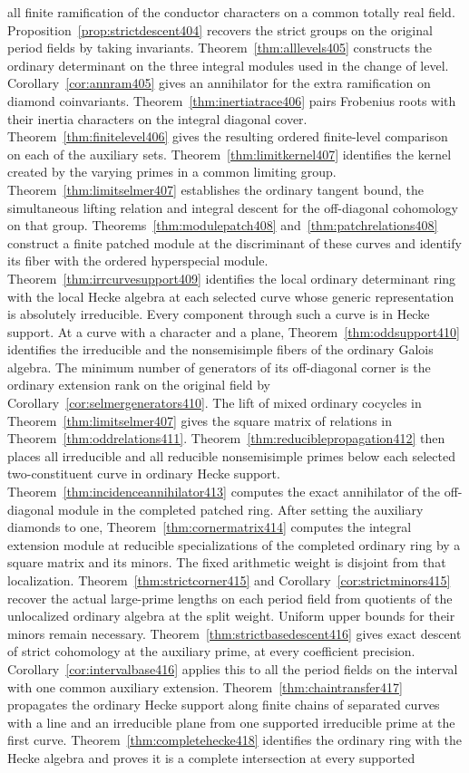 \documentclass[a4paper,11pt]{article}
\theoremstyle{definition}
\theoremstyle{remark}
\numberwithin{equation}{section}
\begin{document}
all finite ramification of the conductor characters on a common totally real field. Proposition~\ref{prop:strictdescent404} recovers the strict groups on the original period fields by taking invariants. Theorem~\ref{thm:alllevels405} constructs the ordinary determinant on the three integral modules used in the change of level. Corollary~\ref{cor:annram405} gives an annihilator for the extra ramification on diamond coinvariants. Theorem~\ref{thm:inertiatrace406} pairs Frobenius roots with their inertia characters on the integral diagonal cover. Theorem~\ref{thm:finitelevel406} gives the resulting ordered finite-level comparison on each of the auxiliary sets. Theorem~\ref{thm:limitkernel407} identifies the kernel created by the varying primes in a common limiting group. Theorem~\ref{thm:limitselmer407} establishes the ordinary tangent bound, the simultaneous lifting relation and integral descent for the off-diagonal cohomology on that group. Theorems~\ref{thm:modulepatch408} and~\ref{thm:patchrelations408} construct a finite patched module at the discriminant of these curves and identify its fiber with the ordered hyperspecial module. Theorem~\ref{thm:irrcurvesupport409} identifies the local ordinary determinant ring with the local Hecke algebra at each selected curve whose generic representation is absolutely irreducible. Every component through such a curve is in Hecke support. At a curve with a character and a plane, Theorem~\ref{thm:oddsupport410} identifies the irreducible and the nonsemisimple fibers of the ordinary Galois algebra. The minimum number of generators of its off-diagonal corner is the ordinary extension rank on the original field by Corollary~\ref{cor:selmergenerators410}. The lift of mixed ordinary cocycles in Theorem~\ref{thm:limitselmer407} gives the square matrix of relations in Theorem~\ref{thm:oddrelations411}. Theorem~\ref{thm:reduciblepropagation412} then places all irreducible and all reducible nonsemisimple primes below each selected two-constituent curve in ordinary Hecke support. Theorem~\ref{thm:incidenceannihilator413} computes the exact annihilator of the off-diagonal module in the completed patched ring. After setting the auxiliary diamonds to one, Theorem~\ref{thm:cornermatrix414} computes the integral extension module at reducible specializations of the completed ordinary ring by a square matrix and its minors. The fixed arithmetic weight is disjoint from that localization. Theorem~\ref{thm:strictcorner415} and Corollary~\ref{cor:strictminors415} recover the actual large-prime lengths on each period field from quotients of the unlocalized ordinary algebra at the split weight. Uniform upper bounds for their minors remain necessary. Theorem~\ref{thm:strictbasedescent416} gives exact descent of strict cohomology at the auxiliary prime, at every coefficient precision. Corollary~\ref{cor:intervalbase416} applies this to all the period fields on the interval with one common auxiliary extension. Theorem~\ref{thm:chaintransfer417} propagates the ordinary Hecke support along finite chains of separated curves with a line and an irreducible plane from one supported irreducible prime at the first curve. Theorem~\ref{thm:completehecke418} identifies the ordinary ring with the Hecke algebra and proves it is a complete intersection at every supported 
\end{document}
